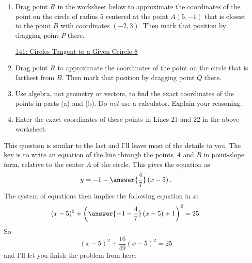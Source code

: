 \documentclass{ximera}
\begin{document}
\begin{question}  \label{QKdf49e46r4333}
\begin{enumerate}

\item Drag point $R$ in the worksheet below to approximate the coordinates of the point on the circle of radius $5$ centered at the point $A(5,-1)$ that is closest to the point $B$ with coordinates $(-2,3)$. Then mark that position by dragging point $P$ there.

\begin{onlineOnly}
    \begin{center}
\end{center}
\end{onlineOnly}

\href{https://www.desmos.com/calculator/pvomdwhlcd}{141: Circles Tangent to a Given Crircle 8}

\item Drag point $R$ to approximate the coordinates of the point on the circle that is farthest from $B$. Then mark that position by dragging point $Q$ there.

\item Use algebra, not geometry or vectors, to find the exact coordinates of the points in parts (a) and (b). Do \emph{not} use a calculator. Explain your reasoning.

\item Enter the exact coordinates of these points in Lines 21 and 22 in the above worksheet.
\end{enumerate}

\begin{explanation}
This question is similar to the last and I'll leave most of the details to you. The key is to write an equation of the line through the points $A$ and $B$ in point-slope form, relative to the center $A$ of the circle. This gives the equation as
\[
       y = -1 - \answer{\frac{4}{7}}\left( x - 5 \right) .
\]
The system of equations then implies the following equation in $x$:
\[
   (x-5)^2 + \left( \answer{-1 -\frac{4}{7}}\left( x - 5 \right) +1  \right)^2 = 25.
\]
So
\[
  (x-5)^2 + \frac{16}{49}\left(x-5 \right)^2 = 25
\]
and I'll let you finish the problem from here.
\end{explanation}

\end{question}
\end{document}
